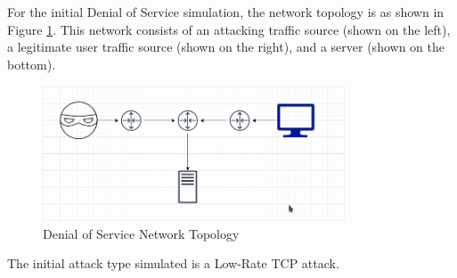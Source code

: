 For the initial Denial of Service simulation, the network topology is as shown
in Figure \ref{fig:dosNetwork}. This network consists of an attacking traffic
source (shown on the left), a legitimate user traffic source (shown on the
right), and a server (shown on the bottom).

\begin{figure}[H]
	\centering
	\includegraphics[width=0.8\textwidth]{images/dosNetwork}
	\caption{Denial of Service Network Topology}
	\label{fig:dosNetwork}
\end{figure}

The initial attack type simulated is a Low-Rate TCP attack.
